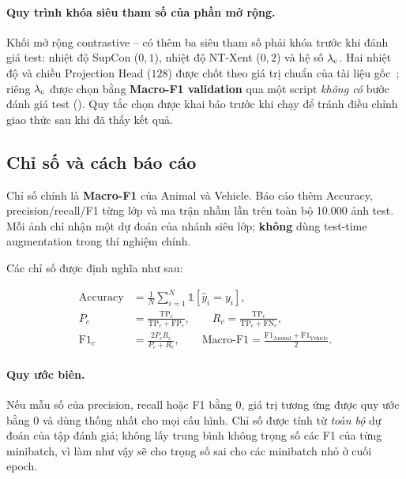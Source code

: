 \paragraph{Quy trình khóa siêu tham số của phần mở rộng.}
Khối mở rộng contrastive -- có thêm ba siêu tham số phải khóa trước khi đánh giá
test: nhiệt độ SupCon ($0{,}1$), nhiệt độ NT-Xent ($0{,}2$) và hệ số $\lambda_{\mathrm{c}}$. Hai nhiệt độ và
chiều Projection Head ($128$) được chốt theo giá trị chuẩn của tài liệu
gốc~\cite{chen2020simclr,khosla2020supcon}; riêng $\lambda_{\mathrm{c}}$ được chọn bằng \textbf{Macro-F1
validation} qua một script \emph{không có} bước đánh giá test ().
Quy tắc chọn được khai báo trước khi chạy để tránh điều chỉnh giao thức sau khi đã thấy kết quả.

\subsection{Chỉ số và cách báo cáo}
\label{sec:metrics}

Chỉ số chính là \textbf{Macro-F1} của Animal và Vehicle. Báo cáo thêm Accuracy,
precision/recall/F1 từng lớp và ma trận nhầm lẫn trên toàn bộ 10.000 ảnh test. Mỗi ảnh chỉ nhận
một dự đoán của nhánh siêu lớp; \textbf{không} dùng test-time augmentation trong thí nghiệm
chính.

Các chỉ số được định nghĩa như sau:

\begin{align}
  \mathrm{Accuracy} &= \frac{1}{N}\sum_{i=1}^{N} \mathbb{1}\!\left[\hat{y}_i = y_i\right],
  \label{eq:acc}\\
  P_c &= \frac{\mathrm{TP}_c}{\mathrm{TP}_c + \mathrm{FP}_c}, \qquad
  R_c = \frac{\mathrm{TP}_c}{\mathrm{TP}_c + \mathrm{FN}_c}, \label{eq:pr}\\
  \mathrm{F1}_c &= \frac{2 P_c R_c}{P_c + R_c}, \qquad
  \mathrm{Macro\text{-}F1} = \frac{\mathrm{F1}_{\mathrm{Animal}} + \mathrm{F1}_{\mathrm{Vehicle}}}{2}.
  \label{eq:macro}
\end{align}

\paragraph{Quy ước biên.} Nếu mẫu số của precision, recall hoặc F1 bằng $0$, giá trị tương ứng
được quy ước bằng $0$ và dùng thống nhất cho mọi cấu hình. Chỉ số được tính từ \emph{toàn bộ}
dự đoán của tập đánh giá; không lấy trung bình không trọng số các F1 của từng minibatch, vì
làm như vậy sẽ cho trọng số sai cho các minibatch nhỏ ở cuối epoch.


